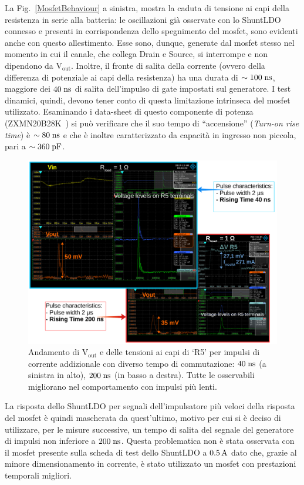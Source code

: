 La Fig.~\ref{MosfetBehaviour} a sinistra, mostra la caduta di tensione ai capi della resistenza in serie alla batteria: le oscillazioni già osservate con lo ShuntLDO connesso e presenti in corrispondenza dello spegnimento del mosfet, sono evidenti anche con questo allestimento.
Esse sono, dunque, generate dal mosfet stesso nel momento in cui il canale, che collega Drain e Source, si interrompe e non dipendono da $\mathrm{V_{out}}$.
Inoltre, il fronte di salita della corrente (ovvero della differenza di potenziale ai capi della resistenza) ha una durata di $\sim 100 \rm \; ns$, maggiore dei $40\rm \; ns$ di salita dell'impulso di gate impostati sul generatore. I test dinamici, quindi, devono tener conto di questa limitazione intrinseca del mosfet utilizzato. Esaminando i data-sheet di questo componente di potenza (ZXMN20B28K~\cite{MOSFET}) si può verificare che il suo tempo di ``accensione'' (\textit{Turn-on rise time}) è $\sim 80 \rm \; ns$ e che \`e inoltre caratterizzato da capacità in ingresso non piccola, pari a $\sim 360\rm \; pF$.
\begin{figure}
\centering
\includegraphics[width=\linewidth]{Immagini/RiseTime}
\caption{Andamento di $\mathrm{V_{out}}$ e delle tensioni ai capi di `R5' per impulsi di corrente addizionale con diverso tempo di commutazione: $40\rm \; ns$ (a sinistra in alto), $200\rm \; ns$ (in basso a destra). Tutte le osservabili migliorano nel comportamento con impulsi pi\`u lenti.}
\label{RiseTime}
\end{figure}

La risposta dello ShuntLDO per segnali dell'impulsatore più veloci della risposta del mosfet è quindi mascherata da quest'ultimo, motivo per cui si è deciso di utilizzare, per le misure successive, un tempo di salita del segnale del generatore di impulsi non inferiore a $200\rm \; ns$. Questa problematica non \`e stata osservata con il mosfet presente sulla scheda di test dello ShuntLDO a $0.5\rm \, A$ dato che, grazie al minore dimensionamento in corrente, \`e stato utilizzato un mosfet con prestazioni temporali migliori.


